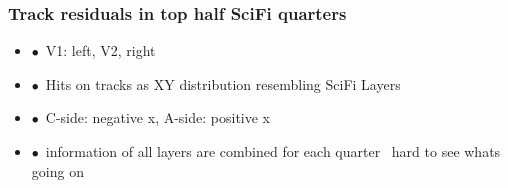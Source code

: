 \documentclass[aspectratio=1610, 12pt]{beamer}
\begin{document}
\begin{frame}\frametitle{Track residuals in top half SciFi quarters}
  \begin{itemize}
    \item $\bullet$\, V1: left, V2, right
    \item $\bullet$\, Hits on tracks as XY distribution resembling SciFi Layers
    \item $\bullet$\, C-side: negative x, A-side: positive x
    \item $\bullet$\, information of all layers are combined for each quarter \to\, hard to see whats going on
  \end{itemize}
  \begin{figure}
  \end{figure}
\end{frame}
\end{document}
